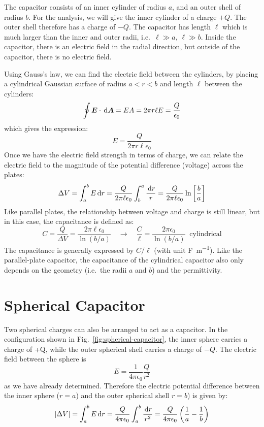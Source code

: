 The capacitor consists of an inner cylinder of radius $a$, and an outer shell
of radius $b$. For the analysis, we will give the inner cylinder of a charge
$+Q$. The outer shell therefore has a charge of $-Q$. The capacitor has length
$\ell$ which is much larger than the inner and outer radii, i.e.\
$\ell\gg a$, $\ell\gg b$. Inside the capacitor, there is an  electric field in
the radial direction, but outside of the capacitor, there is no electric field.

Using Gauss's law, we can find the electric field between the cylinders, by
placing a cylindrical Gaussian surface of radius $a<r<b$ and length $\ell$
between the cylinders: 
\begin{equation*}
  \oint\bm E\cdot\dl{\bm A}=EA=2\pi r\ell E=\frac Q{\epsilon_0}
\end{equation*}
which gives the expression:
\begin{equation}
  E=\frac Q{2\pi r\ell\epsilon_0}%
\end{equation}
Once we have the electric field strength in terms of charge, we can relate the
electric field to the magnitude of the potential difference (voltage) across
the plates:
\begin{equation}
  \Delta V= \int_a^b E\dl r=\frac Q{2\pi\ell\epsilon_0}\int_b^a\frac{\dl r}r
  =\frac Q{2\pi\ell\epsilon_0}\ln\left[\frac ba\right]
\end{equation}
Like parallel plates, the relationship between voltage and charge is still
linear, but in this case, the capacitance is defined as:  
\begin{equation}
  C=\frac Q{\Delta V}=\frac{2\pi\ell\epsilon_0}{\ln(b/a)}
  \quad\longrightarrow\quad
  \boxed{\frac C\ell=\frac{2\pi\epsilon_0}{\ln(b/a)}\;\;\text{cylindrical}}
\end{equation}
The capacitance is generally expressed by $C/\ell$ (with unit
\si{\farad\per\metre}). Like the parallel-plate capacitor, the capacitance of
the cylindrical capacitor also only depends on the geometry (i.e.\ the radii
$a$ and $b$) and the permittivity.


\section{Spherical Capacitor}
Two spherical charges can also be arranged to act as a capacitor. In the
configuration shown in Fig.~\ref{fig:spherical-capacitor}, the inner sphere
carries a charge of +Q, while the outer spherical shell carries a charge of
$-Q$. The electric field between the sphere is
\begin{equation*}
  E=\frac1{4\pi\epsilon_0}\frac Q{r^2}
\end{equation*}
as we have already determined. Therefore the electric potential difference
between the inner sphere ($r=a$) and the outer spherical shell $r=b$) is given
by:
\begin{equation*}
  |\Delta V|=\int_a^bE\dl r=\frac Q{4\pi\epsilon_0}\int_a^b\frac{\dl r}{r^2}
  =\frac Q{4\pi\epsilon_0}\left(\frac1a-\frac1b\right)
\end{equation*}

